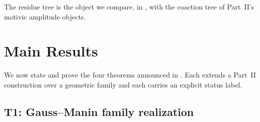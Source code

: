 \documentclass[12pt]{article}
\theoremstyle{definition}
\theoremstyle{remark}
\begin{document}
The residue tree is the object we compare, in , with the coaction tree of Part~II's
motivic amplitude objects.

\section{Main Results}
\label{sec:theorems}

We now state and prove the four theorems announced in . Each extends a Part~II
construction over a geometric family and each carries an explicit status label.

\subsection{T1: Gauss--Manin family realization}
\end{document}
